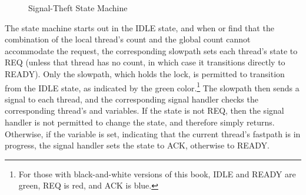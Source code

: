 \begin{figure}[tb]
\centering
{}
\caption{Signal-Theft State Machine}
\label{fig:count:Signal-Theft State Machine}
\end{figure}

The state machine starts out in the IDLE state, and when 
or  find that the combination of the local thread's count
and the global count cannot accommodate the request, the corresponding
slowpath sets each thread's  state to REQ (unless that thread
has no count, in which case it transitions directly to READY).
Only the slowpath, which holds the  lock, is permitted to
transition from the IDLE state, as indicated by the green color.\footnote{
	For those with black-and-white versions of this book,
	IDLE and READY are green, REQ is red, and ACK is blue.}
The slowpath then sends a signal to each thread, and the corresponding
signal handler checks the corresponding thread's  and
 variables.
If the  state is not REQ, then the signal handler is not
permitted to change the state, and therefore simply returns.
Otherwise, if the  variable is set, indicating that
the current thread's fastpath is in progress, the signal handler
sets the  state to ACK, otherwise to READY\@.

